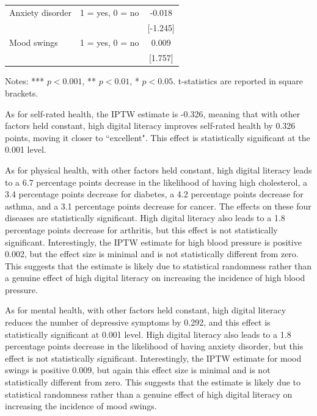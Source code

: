 \begin{table}[h!]
\begin{threeparttable}
\begin{tabular}{llc}
            Anxiety disorder & 1 = yes, 0 = no  & -0.018 \\
            &  & [-1.245] \\
            Mood swings & 1 = yes, 0 = no  & 0.009 \\
            &  & [1.757] \\
            \bottomrule
        \end{tabular}
        \begin{tablenotes}
            \footnotesize
            \item Notes: *** $p < 0.001$, ** $p < 0.01$, * $p < 0.05$. t-statistics are reported in square brackets.
        \end{tablenotes}
    \end{threeparttable}
\end{table}

As for self-rated health, the IPTW estimate is -0.326, meaning that with other factors held constant, high digital literacy improves self-rated health by 0.326 points, moving it closer to ``excellent". This effect is statistically significant at the 0.001 level.

As for physical health, with other factors held constant, high digital literacy leads to a 6.7 percentage points decrease in the likelihood of having high cholesterol, a 3.4 percentage points decrease for diabetes, a 4.2 percentage points decrease for asthma, and a 3.1 percentage points decrease for cancer. The effects on these four diseases are statistically significant. High digital literacy also leads to a 1.8 percentage points decrease for arthritis, but this effect is not statistically significant. Interestingly, the IPTW estimate for high blood pressure is positive 0.002, but the effect size is minimal and is not statistically different from zero. This suggests that the estimate is likely due to statistical randomness rather than a genuine effect of high digital literacy on increasing the incidence of high blood pressure.

As for mental health, with other factors held constant, high digital literacy reduces the number of depressive symptoms by 0.292, and this effect is statistically significant at 0.001 level. High digital literacy also leads to a 1.8 percentage points decrease in the likelihood of having anxiety disorder, but this effect is not statistically significant. Interestingly, the IPTW estimate for mood swings is positive 0.009, but again this effect size is minimal and is not statistically different from zero. This suggests that the estimate is likely due to statistical randomness rather than a genuine effect of high digital literacy on increasing the incidence of mood swings.

